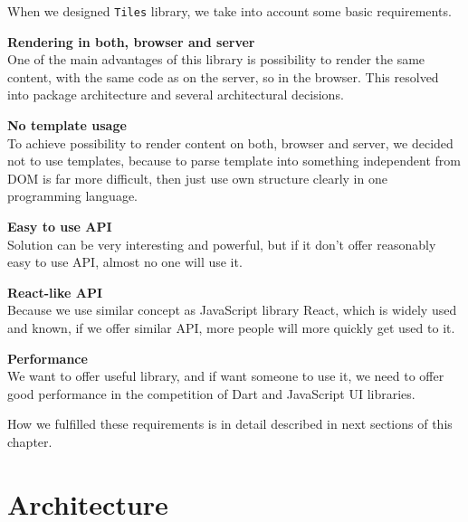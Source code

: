 \documentclass[oneside, 12pt]{book}
\begin{document}
  When we designed \texttt{Tiles} library, we take into account some basic requirements. 
  \begin{description}
    \item{\textbf{Rendering in both, browser and server}} \hfill \\
      One of the main advantages of this library is possibility to render the same content, 
      with the same code as on the server, so in the browser.
      This resolved into package architecture and several architectural decisions.
      \begin{description}
        \item{\textbf{No template usage}} \hfill \\
          To achieve possibility to render content on both, browser and server, 
          we decided not to use templates, 
          because to parse template into something independent from DOM is far more difficult,
          then just use own structure clearly in one programming language.
      \end{description}
    \item{\textbf{Easy to use API}} \hfill \\
      Solution can be very interesting and powerful, 
      but if it don't offer reasonably easy to use API, almost no one will use it.
      \begin{description}
        \item{\textbf{React-like API}} \hfill \\
          Because we use similar concept as JavaScript library React,  
          which is widely used and known, 
          if we offer similar API, more people will more quickly get used to it.
      \end{description}
    \item{\textbf{Performance}} \hfill \\
      We want to offer useful library, and if want someone to use it, 
      we need to offer good performance in the competition of Dart and JavaScript UI libraries.
  \end{description}

  How we fulfilled these requirements is in detail described in next sections of this chapter.

\section{Architecture}\label{sec:our-architecture}
\end{document}
